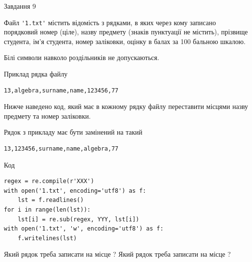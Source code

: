 \documentclass[12pt, ukrainian]{article}
\def\code#1{\Verb!#1!}
\begin{document}
{\begin{minipage}[t]{8.0cm}
\end{minipage}

               
{\begin{center}Завдання {9}\end{center}}
\vspace{-6mm}
Файл \code{'1.txt'} містить відомість з рядками, в яких через кому записано поряд\-ковий номер (ціле), назву предмету (знаків пунктуації не містить), прізвище студента, ім'я студента, номер заліковки, оцінку в балах за 100 бальною шкалою.

Білі символи навколо роздільників не допускаються.

Приклад рядка файлу



\begin{verbatim}
13,algebra,surname,name,123456,77
\end{verbatim}


Нижче наведено код, який має в кожному рядку файлу переставити місцями назву предмету та номер заліковки.

Рядок з прикладу має бути замінений на такий



\begin{verbatim}
13,123456,surname,name,algebra,77
\end{verbatim}




Код



\begin{verbatim}
regex = re.compile(r'XXX')
with open('1.txt', encoding='utf8') as f:
    lst = f.readlines()
for i in range(len(lst)):
    lst[i] = re.sub(regex, YYY, lst[i])
with open('1.txt', 'w', encoding='utf8') as f:
    f.writelines(lst)
\end{verbatim}





Який рядок треба записати на місце  ?
Який рядок треба записати на місце  ?\par

}
\newpage
\end{document}
